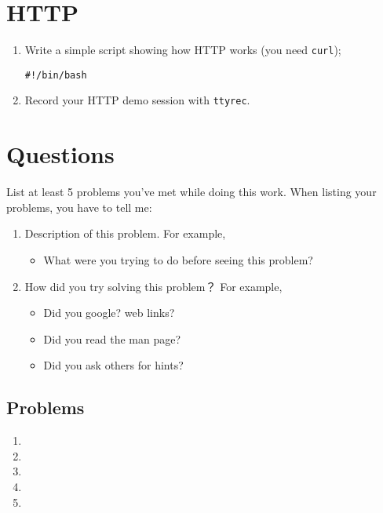\documentclass{wx672ctexart} \usepackage{hyperref}
\begin{document}
\section{HTTP}
\label{sec:org7adcbc1}
\begin{enumerate}
\item Write a simple script showing how HTTP works (you need \texttt{curl});
\begin{verbatim}
#!/bin/bash

\end{verbatim}

\item Record your HTTP demo session with \texttt{ttyrec}.
\end{enumerate}

\section{Questions}
\label{sec:org1ca3828}
List at least 5 problems you've met while doing this work. When listing your problems,
you have to tell me:
\begin{enumerate}
\item Description of this problem. For example,
\begin{itemize}
\item What were you trying to do before seeing this problem?
\end{itemize}
\item How did you try solving this problem？ For example,
\begin{itemize}
\item Did you google? web links?
\item Did you read the man page?
\item Did you ask others for hints?
\end{itemize}
\end{enumerate}

\subsection{Problems}
\label{sec:org7e2d169}
\begin{enumerate}
\item 

\item 

\item 

\item 

\item 
\end{enumerate}
\end{document}
